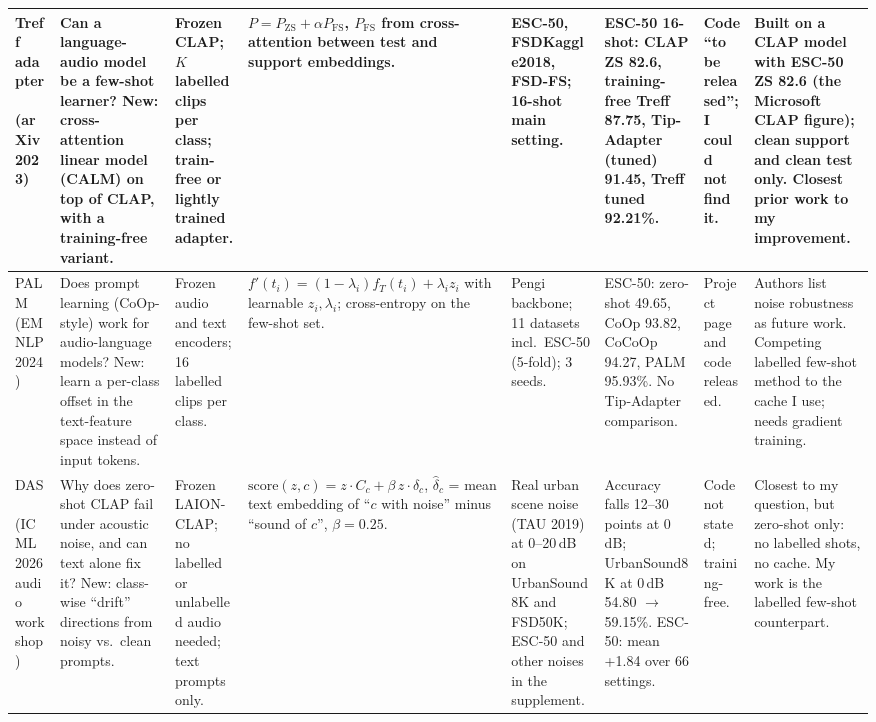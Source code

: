 \begin{landscape}
\begin{table}
\begin{tabularx}{\linewidth}{@{}>{\raggedright\arraybackslash}p{1.75cm}*{7}{>{\raggedright\arraybackslash}X}@{}}
\midrule
Treff adapter~\cite{liang2023treff} (arXiv 2023) &
Can a language-audio model be a few-shot learner? New: cross-attention linear model (CALM) on top of CLAP, with a training-free variant. &
Frozen CLAP; $K$ labelled clips per class; train-free or lightly trained adapter. &
$P = P_{\text{ZS}} + \alpha P_{\text{FS}}$, $P_{\text{FS}}$ from cross-attention between test and support embeddings. &
ESC-50, FSDKaggle2018, FSD-FS; 16-shot main setting. &
ESC-50 16-shot: CLAP ZS 82.6, training-free Treff 87.75, Tip-Adapter (tuned) 91.45, Treff tuned 92.21\%. &
Code ``to be released''; I could not find it. &
Built on a CLAP model with ESC-50 ZS 82.6 (the Microsoft CLAP figure); clean support and clean test only. Closest prior work to my improvement. \\
\midrule
PALM~\cite{hanif2024palm} (EMNLP 2024) &
Does prompt learning (CoOp-style) work for audio-language models? New: learn a per-class offset in the text-feature space instead of input tokens. &
Frozen audio and text encoders; 16 labelled clips per class. &
$f'(t_i) = (1-\lambda_i) f_T(t_i) + \lambda_i z_i$ with learnable $z_i, \lambda_i$; cross-entropy on the few-shot set. &
Pengi backbone; 11 datasets incl.\ ESC-50 (5-fold); 3 seeds. &
ESC-50: zero-shot 49.65, CoOp 93.82, CoCoOp 94.27, PALM 95.93\%. No Tip-Adapter comparison. &
Project page and code released. &
Authors list noise robustness as future work. Competing labelled few-shot method to the cache I use; needs gradient training. \\
\midrule
DAS~\cite{vo2026das} (ICML 2026 audio workshop) &
Why does zero-shot CLAP fail under acoustic noise, and can text alone fix it? New: class-wise ``drift'' directions from noisy vs.\ clean prompts. &
Frozen LAION-CLAP; no labelled or unlabelled audio needed; text prompts only. &
$\text{score}(z,c) = z\cdot C_c + \beta\, z\cdot\hat\delta_c$, $\hat\delta_c$ = mean text embedding of ``$c$ with noise'' minus ``sound of $c$'', $\beta = 0.25$. &
Real urban scene noise (TAU 2019) at 0--20\,dB on UrbanSound8K and FSD50K; ESC-50 and other noises in the supplement. &
Accuracy falls 12--30 points at 0\,dB; UrbanSound8K at 0\,dB 54.80 $\to$ 59.15\%. ESC-50: mean +1.84 over 66 settings. &
Code not stated; training-free. &
Closest to my question, but zero-shot only: no labelled shots, no cache. My work is the labelled few-shot counterpart. \\
\bottomrule
\end{tabularx}
\end{table}
\end{landscape}

